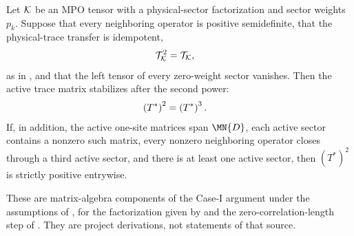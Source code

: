 \begin{lemma}
    \label{thm:mpdo_active_trace_matrix_literal_zcl_powers}
    \leanok
    Let ${\cal K}$ be an MPO tensor with a physical-sector factorization
    and sector weights $p_k$. Suppose that every neighboring operator
    is positive semidefinite, that the physical-trace transfer is
    idempotent,
    \begin{align}
        \mathcal T_{\cal K}^2 & =\mathcal T_{\cal K},
        \notag
    \end{align}
    as in \cite[Definition~4.2, lines~735--741]{Cirac2016MPDO_arXiv},
    and that the left tensor of every zero-weight sector vanishes. Then
    the active trace matrix stabilizes after the second power:
    \begin{align}
        \left(T^*\right)^2 & =\left(T^*\right)^3.
        \notag
    \end{align}
    If, in addition, the active one-site matrices span $\MN{D}$, each
    active sector contains a nonzero such matrix, every nonzero
    neighboring operator closes through a third active sector, and
    there is at least one active sector, then $(T^*)^2$ is strictly
    positive entrywise.

    These are matrix-algebra components of the Case-I argument under
    the assumptions of
    \cite[Appendix~C.2, lines~1374--1381]{Cirac2016MPDO_arXiv}, for the
    factorization given by
    \cite[Appendix~C.2, Lemma~C.4, lines~1406--1471]{Cirac2016MPDO_arXiv}
    and the zero-correlation-length step of
    \cite[Appendix~C.2, Lemma~C.5, lines~1473--1499]{Cirac2016MPDO_arXiv}.
    They are project derivations, not statements of that source.
\end{lemma}

